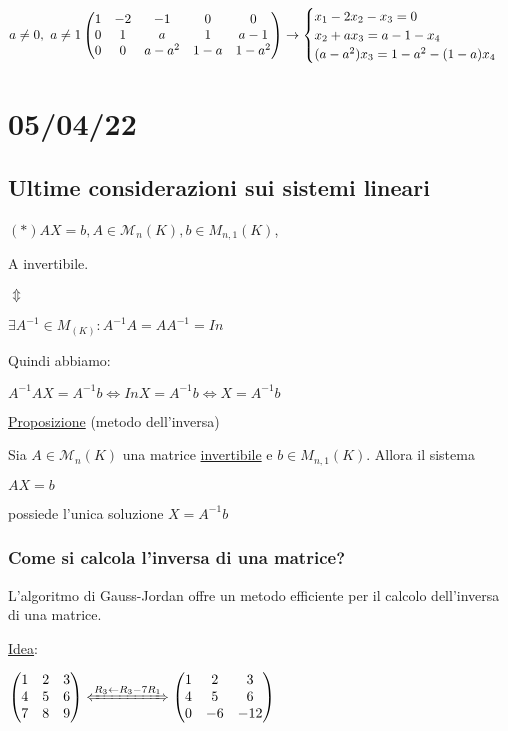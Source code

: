 \documentclass{article}
\newcommand{\ul}[1]{\underline{#1}}
\newcommand{\M}{\mathcal{M}}
\begin{document}
\begin{enumerate}
\begin{enumerate}
		  $a\not=0,\ a\not=1\\
			\begin{pmatrix}
				1 & -2 & -1    & 0   & 0     \\
				0 & 1  & a     & 1   & a-1   \\
				0 & 0  & a-a^2 & 1-a & 1-a^2
			\end{pmatrix}\rightarrow
			\begin{cases}
				x_1-2x_2-x_3=0   \\
				x_2+ax_3=a-1-x_4 \\
				(a-a^2)x_3=1-a^2-(1-a)x_4
			\end{cases}$
	\end{enumerate}
\end{enumerate}
\section{05/04/22}
\subsection{Ultime considerazioni sui sistemi lineari}
$(*)AX=b,A\in \M_n(K),b\in M_{n,1}(K)$,

A invertibile.

$\Updownarrow$

$\exists A^{-1}\in M_(K): A^{-1}A=AA^{-1}=In$

Quindi abbiamo:

$A^{-1}AX=A^{-1}b\Leftrightarrow InX=A^{-1}b\Leftrightarrow X=A^{-1}b$

\ul{Proposizione} (metodo dell'inversa)

Sia $A\in \M_n(K)$ una matrice \ul{invertibile} e $b\in M_{n,1}(K)$. Allora il sistema

$AX=b$

possiede l'unica soluzione $X=A^{-1}b$

\subsubsection*{Come si calcola l'inversa di una matrice?}

L'algoritmo di Gauss-Jordan offre un metodo efficiente per il calcolo dell'inversa di una matrice.

\ul{Idea}:

$\begin{pmatrix}
	1 & 2 & 3 \\
	4 & 5 & 6 \\
	7 & 8 & 9 \\
\end{pmatrix}\xLeftrightarrow{R_3\leftarrow R_3-7R_1}
\begin{pmatrix}
	1 & 2  & 3   \\
	4 & 5  & 6   \\
	0 & -6 & -12 \\
\end{pmatrix}$
\end{document}
